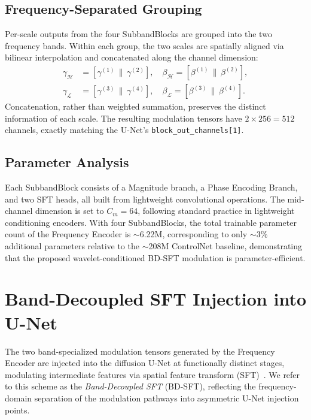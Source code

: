\subsection{Frequency-Separated Grouping}
\label{subsec:multi_level_grouping}

Per-scale outputs from the four SubbandBlocks are grouped into the 
two frequency bands. Within each group, the two scales are 
spatially aligned via bilinear interpolation and concatenated 
along the channel dimension:
\begin{align}
    \gamma_\mathcal{H} &= [\gamma^{(1)} \,\|\, \gamma^{(2)}], 
    \quad 
    \beta_\mathcal{H} = [\beta^{(1)} \,\|\, \beta^{(2)}], 
    \label{eq:high_concat}\\
    \gamma_\mathcal{L} &= [\gamma^{(3)} \,\|\, \gamma^{(4)}], 
    \quad 
    \beta_\mathcal{L} = [\beta^{(3)} \,\|\, \beta^{(4)}].
    \label{eq:low_concat}
\end{align}
Concatenation, rather than weighted summation, preserves the distinct 
information of each scale. The resulting modulation tensors have 
$2 \times 256 = 512$ channels, exactly matching the U-Net's 
\texttt{block\_out\_channels[1]}.

\subsection{Parameter Analysis}
\label{subsec:param_analysis}

Each SubbandBlock consists of a Magnitude branch, a Phase Encoding 
Branch, and two SFT heads, all built from lightweight convolutional 
operations. The mid-channel dimension is set to $C_m = 64$, 
following standard practice in lightweight conditioning encoders. 
With four SubbandBlocks, the total trainable parameter count of 
the Frequency Encoder is $\sim$6.22M, corresponding to only 
$\sim$3\% additional parameters relative to the $\sim$208M 
ControlNet baseline, demonstrating that the proposed 
wavelet-conditioned BD-SFT modulation is parameter-efficient.


\section{Band-Decoupled SFT Injection into U-Net}
\label{sec:bd_sft}

The two band-specialized modulation tensors generated by the 
Frequency Encoder are injected into the diffusion U-Net at 
functionally distinct stages, modulating intermediate features via 
spatial feature transform (SFT)~\cite{wang2018sft}. We refer to 
this scheme as the \emph{Band-Decoupled SFT} (BD-SFT), reflecting 
the frequency-domain separation of the modulation pathways into 
asymmetric U-Net injection points.

